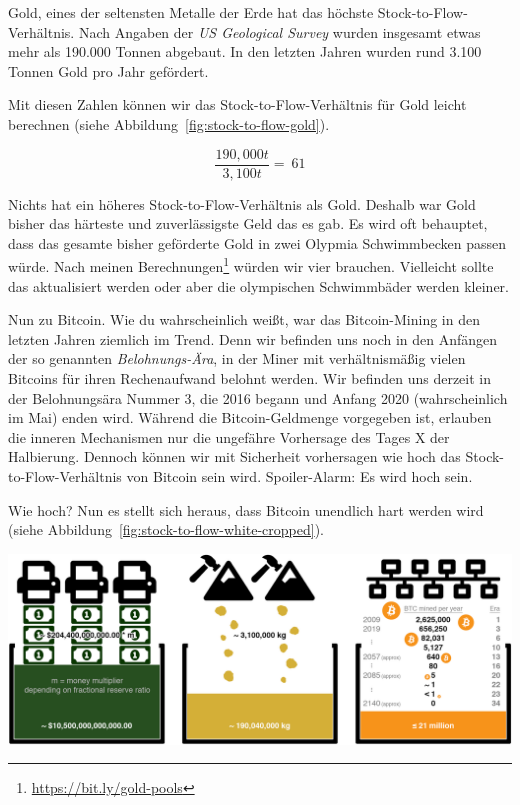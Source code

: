 Gold, eines der seltensten Metalle der Erde hat das höchste
Stock-to-Flow-Verhältnis. Nach Angaben der \textit{US Geological Survey} wurden
insgesamt etwas mehr als 190.000 Tonnen abgebaut. In den letzten Jahren wurden
rund 3.100 Tonnen Gold pro Jahr gefördert.~\cite{mineral-commodity-summaries}

Mit diesen Zahlen können wir das Stock-to-Flow-Verhältnis für Gold leicht
berechnen (siehe Abbildung~\ref{fig:stock-to-flow-gold}).

\begin{center}
  \centering
  \begin{equation}
  \frac{190,000 t}{3,100 t} = ~ 61
  \end{equation}
  \label{fig:stock-to-flow-gold}
\end{center}

Nichts hat ein höheres Stock-to-Flow-Verhältnis als Gold. Deshalb war Gold
bisher das härteste und zuverlässigste Geld das es gab. Es wird oft behauptet,
dass das gesamte bisher geförderte Gold in zwei Olypmia Schwimmbecken passen
würde. Nach meinen Berechnungen\footnote{\url{https://bit.ly/gold-pools}} würden
wir vier brauchen. Vielleicht sollte das aktualisiert werden oder aber die
olympischen Schwimmbäder werden kleiner.

Nun zu Bitcoin. Wie du wahrscheinlich weißt, war das Bitcoin-Mining in den
letzten Jahren ziemlich im Trend. Denn wir befinden uns noch in den Anfängen der
so genannten \textit{Belohnungs-Ära}, in der Miner mit verhältnismäßig vielen
Bitcoins für ihren Rechenaufwand belohnt werden. Wir befinden uns derzeit in der
Belohnungsära Nummer 3, die 2016 begann und Anfang 2020 (wahrscheinlich im Mai)
enden wird. Während die Bitcoin-Geldmenge vorgegeben ist, erlauben die inneren
Mechanismen nur die ungefähre Vorhersage des Tages X der Halbierung. Dennoch
können wir mit Sicherheit vorhersagen wie hoch das Stock-to-Flow-Verhältnis von
Bitcoin sein wird. Spoiler-Alarm: Es wird hoch sein.

Wie hoch? Nun es stellt sich heraus, dass Bitcoin unendlich hart werden wird
(siehe Abbildung~\ref{fig:stock-to-flow-white-cropped}).

\begin{center}
  \includegraphics[width=\textwidth]{assets/images/stock-to-flow-white-cropped.png}
  \label{fig:stock-to-flow-white-cropped}
\end{center}

